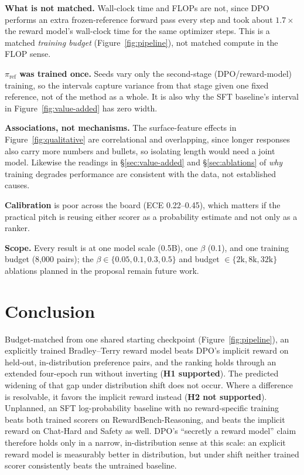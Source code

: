 \documentclass[11pt]{article}
\begin{document}
\textbf{What is not matched.} Wall-clock time and FLOPs are not, since DPO performs an extra
frozen-reference forward pass every step and took about $1.7\times$ the reward model's wall-clock
time for the same optimizer steps. This is a matched \emph{training budget}
(Figure~\ref{fig:pipeline}), not matched compute in the FLOP sense.

\textbf{$\pi_{\mathrm{ref}}$ was trained once.} Seeds vary only the second-stage
(DPO/reward-model) training, so the intervals capture variance from that stage given one fixed
reference, not of the method as a whole. It is also why the SFT baseline's interval in
Figure~\ref{fig:value-added} has zero width.

\textbf{Associations, not mechanisms.} The surface-feature effects in
Figure~\ref{fig:qualitative} are correlational and overlapping, since longer responses also
carry more numbers and bullets, so isolating length would need a joint model. Likewise the
readings in \S\ref{sec:value-added} and \S\ref{sec:ablations} of \emph{why} training degrades
performance are consistent with the data, not established causes.

\textbf{Calibration} is poor across the board (ECE 0.22--0.45), which matters if the practical
pitch is reusing either scorer as a probability estimate and not only as a ranker.

\textbf{Scope.} Every result is at one model scale (0.5B), one $\beta$ (0.1), and one training
budget (8{,}000 pairs); the $\beta \in \{0.05, 0.1, 0.3, 0.5\}$ and budget $\in \{2\text{k},
8\text{k}, 32\text{k}\}$ ablations planned in the proposal remain future work.

\section{Conclusion}
Budget-matched from one shared starting checkpoint (Figure~\ref{fig:pipeline}), an explicitly
trained Bradley--Terry reward model beats DPO's implicit reward on held-out, in-distribution
preference pairs, and the ranking holds through an extended four-epoch run without inverting
(\textbf{H1 supported}). The predicted widening of that gap under distribution shift does not
occur. Where a difference is resolvable, it favors the implicit reward instead (\textbf{H2 not
supported}). Unplanned, an SFT log-probability baseline with no reward-specific training beats
both trained scorers on RewardBench-Reasoning, and beats the implicit reward on Chat-Hard and
Safety as well. DPO's ``secretly a reward model'' claim therefore holds only in a narrow,
in-distribution sense at this scale: an explicit reward model is measurably better in
distribution, but under shift neither trained scorer consistently beats the untrained baseline.
\end{document}
